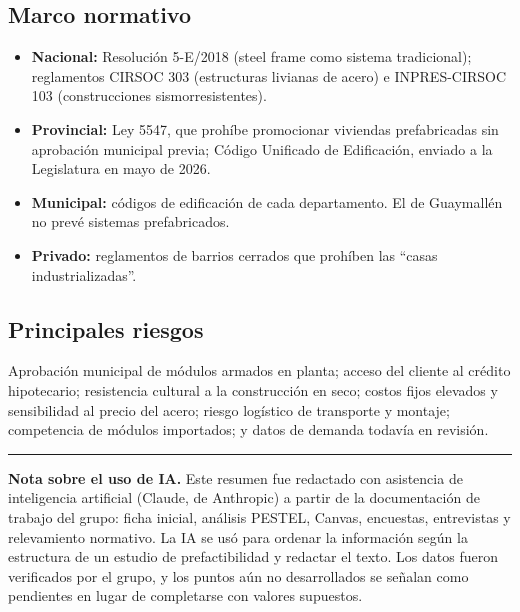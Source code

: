 \documentclass[11pt,a4paper]{article}
\begin{document}
\subsection{Marco normativo}
\begin{itemize}
  \item \textbf{Nacional:} Resolución 5-E/2018 (steel frame como sistema tradicional); reglamentos CIRSOC 303 (estructuras livianas de acero) e INPRES-CIRSOC 103 (construcciones sismorresistentes).
  \item \textbf{Provincial:} Ley 5547, que prohíbe promocionar viviendas prefabricadas sin aprobación municipal previa; Código Unificado de Edificación, enviado a la Legislatura en mayo de 2026.
  \item \textbf{Municipal:} códigos de edificación de cada departamento. El de Guaymallén no prevé sistemas prefabricados.
  \item \textbf{Privado:} reglamentos de barrios cerrados que prohíben las ``casas industrializadas''.
\end{itemize}

\subsection{Principales riesgos}
Aprobación municipal de módulos armados en planta; acceso del cliente al crédito hipotecario; resistencia cultural a la construcción en seco; costos fijos elevados y sensibilidad al precio del acero; riesgo logístico de transporte y montaje; competencia de módulos importados; y datos de demanda todavía en revisión.

\vspace{1.5em}
\noindent\rule{\linewidth}{0.3pt}
{\footnotesize\textbf{Nota sobre el uso de IA.} Este resumen fue redactado con asistencia de inteligencia artificial (Claude, de Anthropic) a partir de la documentación de trabajo del grupo: ficha inicial, análisis PESTEL, Canvas, encuestas, entrevistas y relevamiento normativo. La IA se usó para ordenar la información según la estructura de un estudio de prefactibilidad y redactar el texto. Los datos fueron verificados por el grupo, y los puntos aún no desarrollados se señalan como pendientes en lugar de completarse con valores supuestos.}
\end{document}

